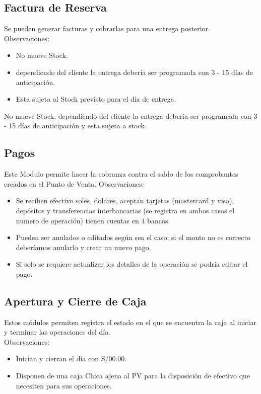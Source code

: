 \documentclass[pdftex,12pt,oneside,a4paper,spanish, english, brazil]{abntex2}
\begin{document}
\begin{sloppypar}
              \subsection{Factura de Reserva}
              Se pueden generar facturas y cobrarlas para una entrega posterior.\\
              Observaciones:
              \begin{itemize}
              	\item No mueve Stock.
              	\item dependiendo del cliente la entrega debería ser programada con 3 - 15 días de anticipación.
              	\item Esta sujeta al Stock previsto para el día de entrega.
              \end{itemize}
              No mueve Stock, dependiendo del cliente la entrega debería ser programada con 3 - 15 días de anticipación y esta sujeta a stock.
              \subsection{Pagos}
              Este Modulo permite hacer la cobranza contra el saldo de los comprobantes creados en el Punto de Venta.
              Observaciones:
              \begin{itemize}
              	\item Se reciben efectivo soles, dolares, aceptan tarjetas (mastercard y visa), depósitos y transferencias interbancarias (se registra en ambos casos el numero de operación) tienen cuentas en 4 bancos.
              	\item Pueden ser anulados o editados según sea el caso; si el monto no es correcto deberíamos anularlo y crear un nuevo pago.
              	\item Si solo se requiere actualizar los detalles de la operación se podría editar el pago.
              \end{itemize}
              
              
              \subsection{Apertura y Cierre de Caja}
              Estos módulos permiten registra el estado en el que se encuentra la caja al iniciar y terminar las operaciones del día.\\
              Observaciones:
              \begin{itemize}
              	\item Inician y cierran el día con S/00.00.
              	\item Disponen de una caja Chica ajena al PV para la disposición de efectivo que necesiten para sus operaciones.
              \end{itemize}

\end{sloppypar}
\end{document}
